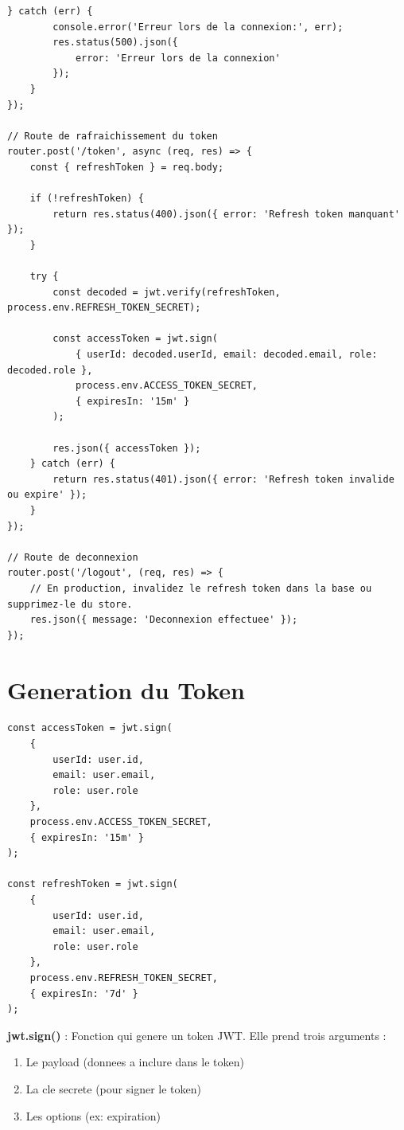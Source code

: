 \documentclass[a4paper,12pt]{book}
\begin{document}
\begin{lstlisting}[style=javascript, caption=routes/auth.js - Route de connexion avec JWT]
    } catch (err) {
        console.error('Erreur lors de la connexion:', err);
        res.status(500).json({
            error: 'Erreur lors de la connexion'
        });
    }
});

// Route de rafraichissement du token
router.post('/token', async (req, res) => {
    const { refreshToken } = req.body;

    if (!refreshToken) {
        return res.status(400).json({ error: 'Refresh token manquant' });
    }

    try {
        const decoded = jwt.verify(refreshToken, process.env.REFRESH_TOKEN_SECRET);

        const accessToken = jwt.sign(
            { userId: decoded.userId, email: decoded.email, role: decoded.role },
            process.env.ACCESS_TOKEN_SECRET,
            { expiresIn: '15m' }
        );

        res.json({ accessToken });
    } catch (err) {
        return res.status(401).json({ error: 'Refresh token invalide ou expire' });
    }
});

// Route de deconnexion
router.post('/logout', (req, res) => {
    // En production, invalidez le refresh token dans la base ou supprimez-le du store.
    res.json({ message: 'Deconnexion effectuee' });
});

\end{lstlisting}

\section{Generation du Token}

\begin{lstlisting}[style=javascript]
const accessToken = jwt.sign(
    {
        userId: user.id,
        email: user.email,
        role: user.role
    },
    process.env.ACCESS_TOKEN_SECRET,
    { expiresIn: '15m' }
);

const refreshToken = jwt.sign(
    {
        userId: user.id,
        email: user.email,
        role: user.role
    },
    process.env.REFRESH_TOKEN_SECRET,
    { expiresIn: '7d' }
);
\end{lstlisting}

\begin{definitionbox}
    \textbf{jwt.sign()} : Fonction qui genere un token JWT. Elle prend trois arguments :
    \begin{enumerate}
        \item Le payload (donnees a inclure dans le token)
        \item La cle secrete (pour signer le token)
        \item Les options (ex: expiration)
    \end{enumerate}
\end{definitionbox}
\end{document}

